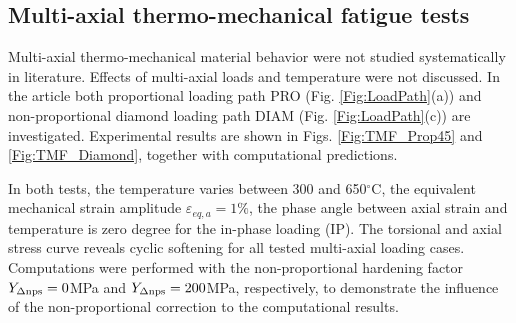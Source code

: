 \documentclass[preprint,5p,twocolumn,11pt,sort&compress]{elsarticle}
\begin{document}
\begin{figure*}
\caption{Experimental and computational results for the diamond strain path under in-phase thermo-mechanical loading conditions with varying temperature between 300 and 650$^{\circ}$C. (a) The first loading cycle. (b) The half life loading cycle. (c) Axial peak-valley normal stress as function of loading cycles. (d) Torsional peak-valley shear stress as function of  loading cycles.}
\label{Fig:TMF_Diamond}
\end{figure*}

\subsection{Multi-axial thermo-mechanical fatigue tests}
\noindent
Multi-axial thermo-mechanical material behavior were not studied systematically in literature. Effects of multi-axial loads and temperature were not discussed. In the article both proportional loading path PRO (Fig. \ref{Fig:LoadPath}(a)) and non-proportional diamond loading path DIAM (Fig. \ref{Fig:LoadPath}(c)) are investigated. Experimental results are shown in Figs. \ref{Fig:TMF_Prop45} and \ref{Fig:TMF_Diamond}, together with computational predictions.

In both tests, the temperature varies between 300 and 650$^{\circ}$C, the equivalent mechanical strain amplitude $\varepsilon_{eq,a}=1\%$, the phase angle between axial strain and temperature is zero degree for the in-phase loading (IP).
The torsional and axial stress curve reveals cyclic softening for all tested multi-axial loading cases.
Computations were performed with the non-proportional hardening factor $Y_{\rm \Delta nps}=0$MPa and $Y_{\rm \Delta nps}=200$MPa, respectively, to demonstrate the influence of the non-proportional correction to the computational results.
\end{document}
